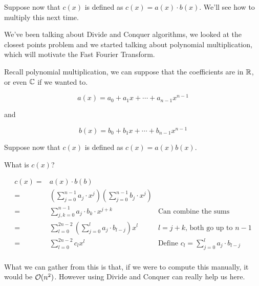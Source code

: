 \documentclass[12pt]{article}
\begin{document}
  Suppose now that $c(x)$ is defined as $c(x) = a(x) \cdot b(x)$. We'll see how to
  multiply this next time.



  We've been talking about Divide and Conquer algorithms, we looked at the
  closest points problem and we started talking about polynomial multiplication,
  which will motivate the Fast Fourier Transform.
  
  Recall polynomial multiplication, we can suppose that the coefficients are in
  ${\mathbb R}$, or even ${\mathbb C}$ if we wanted to.

  \[
    a(x) = a_0 + a_1x + \cdots + a_{n - 1}x^{n - 1}
  \]

  and

  \[
    b(x) = b_0 + b_1x + \cdots + b_{n - 1}x^{n - 1}
  \]

  Suppose now that $c(x)$ is defined as $c(x) = a(x) b(x)$.

  What is $c(x)$?

  \begin{align*}
    c(x) =&a(x) \cdot b(b) \\
         =&\left(\sum_{j = 0}^{n - 1}a_j \cdot x^j\right)\left(\sum_{j = 0}^{n - 1}b_j \cdot x^j\right) \\
         =&\sum_{j,k = 0}^{n - 1} a_j \cdot b_k \cdot x^{j + k} & \text{Can combine the sums} \\
         =&\sum_{l = 0}^{2n - 2} \left( \sum_{j = 0}^{l} a_j \cdot b_{l - j} \right) x^l & \text{$l = j + k$, both go up to $n - 1$} \\
         =&\sum_{l = 0}^{2n - 2} c_l x^l & \text{Define $c_l = \sum_{j = 0}^{l} a_j \cdot b_{l - j}$} \\
  \end{align*}


  What we can gather from this is that, if we were to compute this manually, it
  would be $\mathcal O(n^2)$. However using Divide and Conquer can really help us here.
\end{document}

